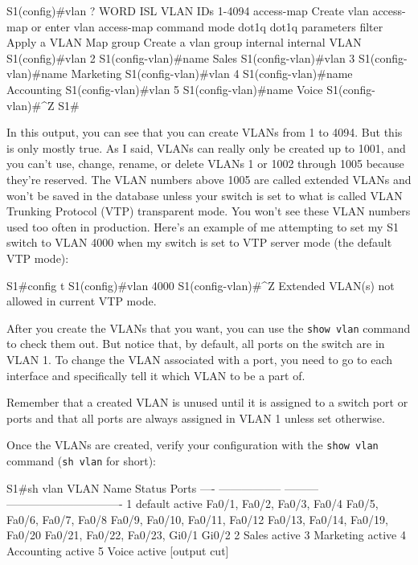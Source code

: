 \begin{cli}
S1(config)#vlan ?
 WORD        ISL VLAN IDs 1-4094
 access-map  Create vlan access-map or enter vlan access-map command mode
 dot1q       dot1q parameters
 filter      Apply a VLAN Map
 group       Create a vlan group
 internal    internal VLAN
S1(config)#vlan 2
S1(config-vlan)#name Sales
S1(config-vlan)#vlan 3
S1(config-vlan)#name Marketing
S1(config-vlan)#vlan 4
S1(config-vlan)#name Accounting
S1(config-vlan)#vlan 5
S1(config-vlan)#name Voice
S1(config-vlan)#^Z
S1#
\end{cli}

In this output, you can see that you can create VLANs from 1 to 4094.
But this is only mostly true.
As I said, VLANs can really only be created up to 1001, and you can't use, change, rename, or delete VLANs 1
or 1002 through 1005 because they're reserved.
The VLAN numbers above 1005 are called extended VLANs and won't be saved in the database unless your switch is set to what is called VLAN Trunking Protocol (VTP)
transparent mode.
You won't see these VLAN numbers used too often in production.
Here's an example of me attempting to set my S1 switch to VLAN 4000 when my switch is set to VTP server mode (the default VTP mode):

\begin{cli}
S1#config t
S1(config)#vlan 4000
S1(config-vlan)#^Z
Extended VLAN(s) not allowed in current VTP mode.
\end{cli}

After you create the VLANs that you want, you can use the
\texttt{show\ vlan} command to check them out. But notice that, by
default, all ports on the switch are in VLAN 1. To change the VLAN
associated with a port, you need to go to each interface and
specifically tell it which VLAN to be a part of.

\begin{note}
Remember that a created VLAN is unused until it is assigned to a switch port or ports and that all ports are always assigned in VLAN 1 unless set otherwise.
\end{note}

Once the VLANs are created, verify your configuration with the
\texttt{show\ vlan} command (\texttt{sh\ vlan} for short):

\begin{cli}
S1#sh vlan
VLAN Name              Status    Ports
---- ----------------- --------- -------------------------------
1    default           active    Fa0/1, Fa0/2, Fa0/3, Fa0/4
                                 Fa0/5, Fa0/6, Fa0/7, Fa0/8
                                 Fa0/9, Fa0/10, Fa0/11, Fa0/12
                                 Fa0/13, Fa0/14, Fa0/19, Fa0/20
                                 Fa0/21, Fa0/22, Fa0/23, Gi0/1
                                 Gi0/2
2    Sales             active
3    Marketing         active
4    Accounting        active
5    Voice             active
[output cut]
\end{cli}

